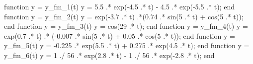 \begin{matlabcode}
function y = y_fm_1(t)
    y = 5.5 .* exp(-4.5 .* t) - 4.5 .* exp(-5.5 .* t);
end
function y = y_fm_2(t)
    y = exp(-3.7 .* t) .*(0.74 .* sin(5 .* t) + cos(5 .* t));
end
function y = y_fm_3(t)
    y = cos(29 .* t);
end
function y = y_fm_4(t)
    y = exp(0.7 .* t) .* (-0.007 .* sin(5 .* t) + 0.05 .* cos(5 .* t));
end
function y = y_fm_5(t)
    y = -0.225 .* exp(5.5 .* t) + 0.275 .* exp(4.5 .* t);
end
function y = y_fm_6(t)
    y = 1 ./ 56 .* exp(2.8 .* t) - 1 ./ 56 .* exp(-2.8 .* t);
end
\end{matlabcode}


